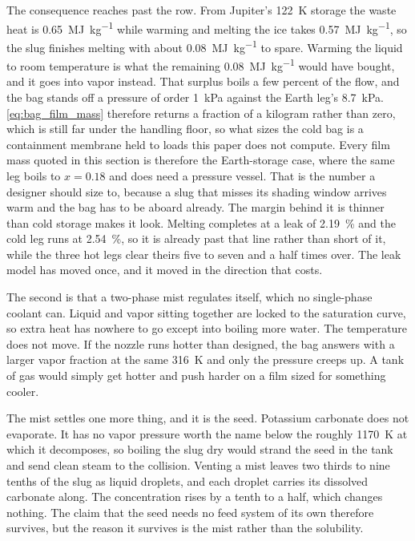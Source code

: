 \documentclass{article}
\begin{document}
The consequence reaches past the row. From Jupiter's \SI{122}{\kelvin} storage the waste heat is \SI{0.65}{\mega\joule\per\kilogram} while warming and melting the ice takes \SI{0.57}{\mega\joule\per\kilogram}, so the slug finishes melting with about \SI{0.08}{\mega\joule\per\kilogram} to spare. Warming the liquid to room temperature is what the remaining \SI{0.08}{\mega\joule\per\kilogram} would have bought, and it goes into vapor instead. That surplus boils a few percent of the flow, and the bag stands off a pressure of order \SI{1}{\kilo\pascal} against the Earth leg's \SI{8.7}{\kilo\pascal}. \autoref{eq:bag_film_mass} therefore returns a fraction of a kilogram rather than zero, which is still far under the handling floor, so what sizes the cold bag is a containment membrane held to loads this paper does not compute. Every film mass quoted in this section is therefore the Earth-storage case, where the same leg boils to $x = 0.18$ and does need a pressure vessel. That is the number a designer should size to, because a slug that misses its shading window arrives warm and the bag has to be aboard already. The margin behind it is thinner than cold storage makes it look. Melting completes at a leak of \SI{2.19}{\percent} and the cold leg runs at \SI{2.54}{\percent}, so it is already past that line rather than short of it, while the three hot legs clear theirs five to seven and a half times over. The leak model has moved once, and it moved in the direction that costs.

The second is that a two-phase mist regulates itself, which no single-phase coolant can. Liquid and vapor sitting together are locked to the saturation curve, so extra heat has nowhere to go except into boiling more water. The temperature does not move. If the nozzle runs hotter than designed, the bag answers with a larger vapor fraction at the same \SI{316}{\kelvin} and only the pressure creeps up. A tank of gas would simply get hotter and push harder on a film sized for something cooler.

The mist settles one more thing, and it is the seed. Potassium carbonate does not evaporate. It has no vapor pressure worth the name below the roughly \SI{1170}{\kelvin} at which it decomposes, so boiling the slug dry would strand the seed in the tank and send clean steam to the collision. Venting a mist leaves two thirds to nine tenths of the slug as liquid droplets, and each droplet carries its dissolved carbonate along. The concentration rises by a tenth to a half, which changes nothing. The claim that the seed needs no feed system of its own therefore survives, but the reason it survives is the mist rather than the solubility.
\end{document}
